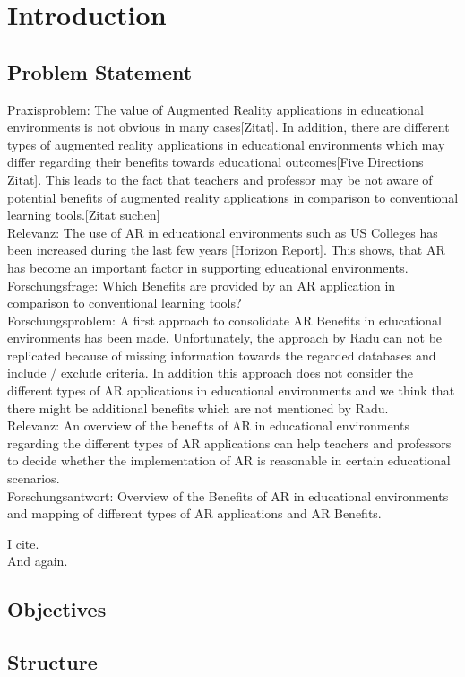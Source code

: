 \section{Introduction}
\subsection{Problem Statement}
Praxisproblem: The value of Augmented Reality applications in educational environments is not obvious in many cases[Zitat]. In addition, there are different types of augmented reality applications in educational environments which may differ regarding their benefits towards educational outcomes[Five Directions Zitat]. This leads to the fact that teachers and professor may be not aware of potential benefits of augmented reality applications in comparison to conventional learning tools.[Zitat suchen]\\
Relevanz: The use of AR in educational environments such as US Colleges has been increased during the last few years [Horizon Report]. This shows, that AR has become an important factor in supporting educational environments.\\
Forschungsfrage: Which Benefits are provided by an AR application in comparison to conventional learning tools? \\
Forschungsproblem: A first approach to consolidate AR Benefits in educational environments has been made. Unfortunately, the approach by Radu can not be replicated because of missing information towards the regarded databases and include / exclude criteria. In addition this approach does not consider the different types of AR applications in educational environments and we think that there might be additional benefits which are not mentioned by Radu.\\
Relevanz: An overview of the benefits of AR in educational environments regarding the different types of AR applications can help teachers and professors to decide whether the implementation of AR is reasonable in certain educational scenarios.\\
Forschungsantwort: Overview of the Benefits of AR in educational environments and mapping of different types of AR applications and AR Benefits.

I cite.\autocite[cf.][149]{Chang.2014}\\
And again.\autocite[4-5]{Dunser.2012}
\subsection{Objectives}
\subsection{Structure}